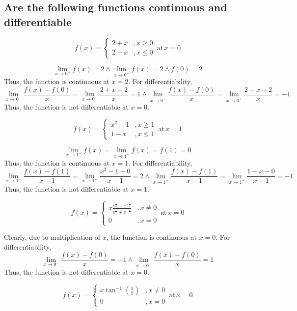 \subsection{Are the following functions continuous and differentiable}
\begin{asign}
	\[f(x)=\begin{cases}
		2+x &, x\geq0\\
		2-x &, x\leq0
	\end{cases} \, \text{at} \, x=0\]
\end{asign}
\begin{anse}
	\[\lim\limits_{x\to0^-}f(x)=2 \land \lim\limits_{x\to 0^+}f(x)=2\land f(0)=2\]
	Thus, the function is continuous at $x=2$.
	For differentiability,
	\[\lim\limits_{x\to 0^-}\frac{f(x)-f(0)}{x}=\lim\limits_{x\to0^-}\frac{2+x-2}{x}=1 \land \lim\limits_{x\to 0^+}\frac{f(x)-f(0)}{x}=\lim\limits_{x\to0^+}\frac{2-x-2}{x}=-1\]
	Thus, the function is not differentiable at $x=0$.
\end{anse}
\begin{asign}
	\[f(x)=\begin{cases}
		x^2-1 &, x\geq 1\\
		1-x &, x\leq1 
	\end{cases}\,\text{at}\, x=1\]
\end{asign}
\begin{anse}
	\[\lim\limits_{x\to1^-}f(x)=\lim\limits_{x\to1^+}f(x)=f(1)=0\]
	Thus, the function is continuous at $x=1$. For differentiability,
	\[\lim\limits_{x\to1^-}\frac{f(x)-f(1)}{x-1}=\lim\limits_{x\to 1^-}\frac{x^2-1-0}{x-1}=2 \land \lim\limits_{x\to1^+}\frac{f(x)-f(1)}{x-1}=\lim\limits_{x\to 1^+}\frac{1-x-0}{x-1}=-1\]
	Thus, the function is not differentiable at $x=1$.
\end{anse}
\begin{asign}
	\[f(x)=\begin{cases}
		x\frac{e^{\frac{1}{x}}-e^{-\frac{1}{x}}}{e^{\frac{1}{x}}+e^{-\frac{1}{x}}} &, x\neq 0\\
		0 &, x=0
	\end{cases}\,\text{at}\,x=0\]
\end{asign}
\begin{anse}
	Clearly, due to multiplication of $x$, the function is continuous at $x=0$. For differentiability,
	\[\lim\limits_{x\to0^-}\frac{f(x)-f(0)}{x}=-1 \land \lim\limits_{x\to0^+}\frac{f(x)-f(0)}{x}=1 \]
	Thus, the function is not differentiable at $x=0$.
\end{anse}
\begin{asign}
	\[f(x)=\begin{cases}
		x\tan^{-1}(\frac{1}{x}) &, x\neq0\\
		0 &, x=0
	\end{cases} \,\text{at}\,x=0\]
\end{asign}
